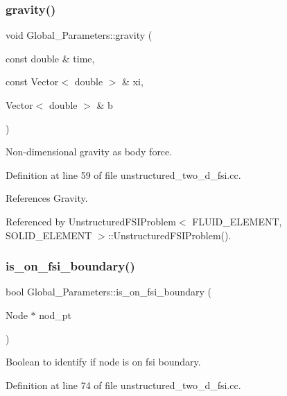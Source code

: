 \subsubsection{\texorpdfstring{gravity()}{gravity()}}
{\footnotesize\ttfamily void Global\+\_\+\+Parameters\+::gravity (\begin{DoxyParamCaption}\item[{const double \&}]{time,  }\item[{const Vector$<$ double $>$ \&}]{xi,  }\item[{Vector$<$ double $>$ \&}]{b }\end{DoxyParamCaption})}



Non-\/dimensional gravity as body force. 



Definition at line 59 of file unstructured\+\_\+two\+\_\+d\+\_\+fsi.\+cc.



References Gravity.



Referenced by Unstructured\+F\+S\+I\+Problem$<$ F\+L\+U\+I\+D\+\_\+\+E\+L\+E\+M\+E\+N\+T, S\+O\+L\+I\+D\+\_\+\+E\+L\+E\+M\+E\+N\+T $>$\+::\+Unstructured\+F\+S\+I\+Problem().

\mbox{\label{namespaceGlobal__Parameters_a655abf819eb3045dac883f2b7073ba22}} 
\subsubsection{\texorpdfstring{is\+\_\+on\+\_\+fsi\+\_\+boundary()}{is\_on\_fsi\_boundary()}}
{\footnotesize\ttfamily bool Global\+\_\+\+Parameters\+::is\+\_\+on\+\_\+fsi\+\_\+boundary (\begin{DoxyParamCaption}\item[{Node $\ast$}]{nod\+\_\+pt }\end{DoxyParamCaption})}



Boolean to identify if node is on fsi boundary. 



Definition at line 74 of file unstructured\+\_\+two\+\_\+d\+\_\+fsi.\+cc.



